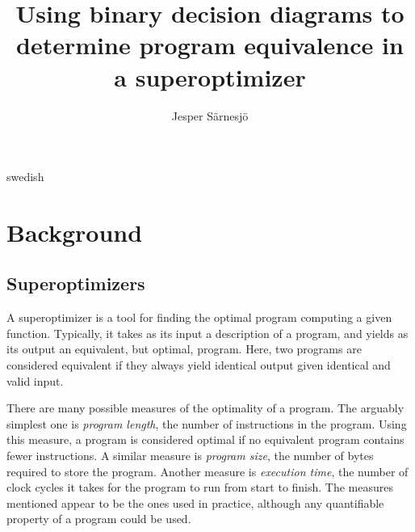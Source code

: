 \documentclass[a4paper,11pt]{kth-mag}
\title{Using binary decision diagrams to determine program equivalence in a superoptimizer}
\subtitle{}
\author{Jesper Särnesjö}
\date{}
\begin{document}
\frontmatter

\pagestyle{empty}

\removepagenumbers

\maketitle


\begin{abstract}
\end{abstract}

\clearpage

\begin{foreignabstract}{swedish}
\end{foreignabstract}

\clearpage

\tableofcontents*

\mainmatter

\pagestyle{newchap}

\chapter{Background}

\section{Superoptimizers}

A superoptimizer is a tool for finding the optimal program computing a given function.  %
Typically, it takes as its input a description of a program, and yields as its output an equivalent, but optimal, program.
Here, two programs are considered equivalent if they always yield identical output given identical and valid input.

There are many possible measures of the optimality of a program.
The arguably simplest one is \emph{program length}, the number of instructions in the program.
Using this measure, a program is considered optimal if no equivalent program contains fewer instructions.
A similar measure is \emph{program size}, the number of bytes required to store the program. %
Another measure is \emph{execution time}, the number of clock cycles it takes for the program to run from start to finish. %
The measures mentioned appear to be the ones used in practice, although any quantifiable property of a program could be used. %
\end{document}
